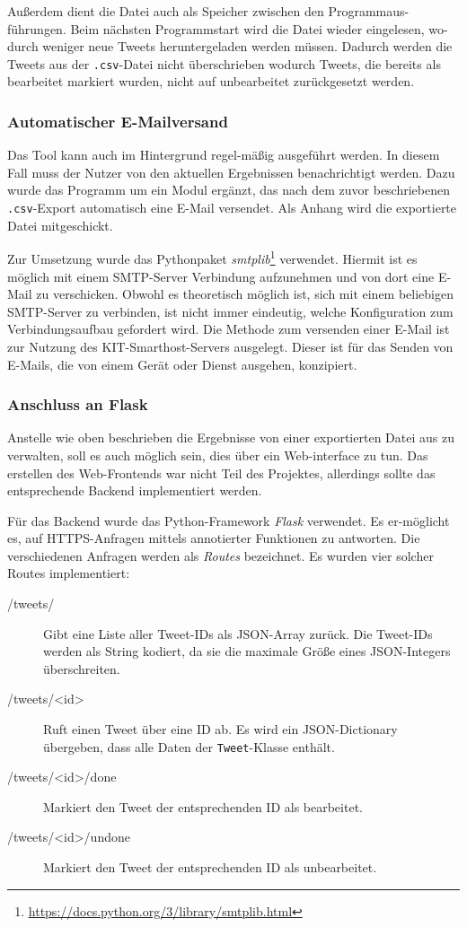 \documentclass[runningheads]{llncs}
\begin{document}
Außerdem dient die Datei auch als Speicher zwischen den Programmaus-führungen.
Beim nächsten Programmstart wird die Datei wieder eingelesen, wo-durch weniger neue Tweets heruntergeladen werden müssen.
Dadurch werden die Tweets aus der \texttt{.csv}-Datei nicht überschrieben wodurch Tweets, die bereits als bearbeitet markiert wurden, nicht auf unbearbeitet zurückgesetzt werden.

\subsubsection{Automatischer E-Mailversand}
Das Tool kann auch im Hintergrund regel-mäßig ausgeführt werden.
In diesem Fall muss der Nutzer von den aktuellen Ergebnissen benachrichtigt werden.
Dazu wurde das Programm um ein Modul ergänzt, das nach dem zuvor beschriebenen \texttt{.csv}-Export automatisch eine E-Mail versendet.
Als Anhang wird die exportierte Datei mitgeschickt.

Zur Umsetzung wurde das Pythonpaket \textit{smtplib}\footnote{\url{https://docs.python.org/3/library/smtplib.html}} verwendet.
Hiermit ist es möglich mit einem SMTP-Server Verbindung aufzunehmen und von dort eine E-Mail zu verschicken.
Obwohl es theoretisch möglich ist, sich mit einem beliebigen SMTP-Server zu verbinden, ist nicht immer eindeutig, welche Konfiguration zum Verbindungsaufbau gefordert wird.
Die Methode zum versenden einer E-Mail ist zur Nutzung des KIT-Smarthost-Servers ausgelegt.
Dieser ist für das Senden von E-Mails, die von einem Gerät oder Dienst ausgehen, konzipiert.

\subsubsection{Anschluss an Flask}
Anstelle wie oben beschrieben die Ergebnisse von einer exportierten Datei aus zu verwalten, soll es auch möglich sein, dies über ein Web-interface zu tun.
Das erstellen des Web-Frontends war nicht Teil des Projektes, allerdings sollte das entsprechende Backend implementiert werden.

Für das Backend wurde das Python-Framework \textit{Flask} verwendet.
Es er-möglicht es, auf HTTPS-Anfragen mittels annotierter Funktionen zu antworten.
Die verschiedenen Anfragen werden als \textit{Routes} bezeichnet.
Es wurden vier solcher Routes implementiert:

\begin{description}
    \item [/tweets/] Gibt eine Liste aller Tweet-IDs als JSON-Array zurück.
        Die Tweet-IDs werden als String kodiert, da sie die maximale Größe eines JSON-Integers überschreiten.
    \item [/tweets/\textless id\textgreater] Ruft einen Tweet über eine ID ab.
        Es wird ein JSON-Dictionary übergeben, dass alle Daten der \texttt{Tweet}-Klasse enthält.
    \item [/tweets/\textless id\textgreater/done] Markiert den Tweet der entsprechenden ID als bearbeitet.
    \item [/tweets/\textless id\textgreater/undone] Markiert den Tweet der entsprechenden ID als unbearbeitet.
\end{description}
\end{document}
